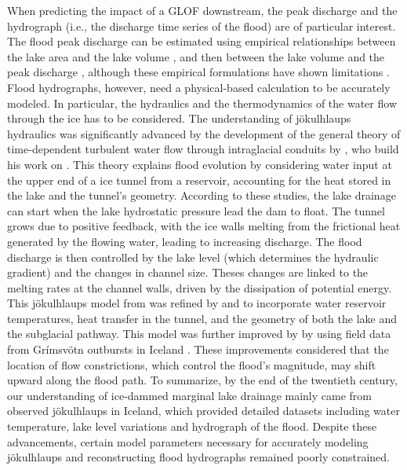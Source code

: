 When predicting the impact of a GLOF downstream, the peak discharge and the hydrograph (i.e., the discharge time series of the flood) are of particular interest. The flood peak discharge can be estimated using empirical relationships between the lake area and the lake volume \citep{Evans1986, Huggel&al2002, Cook&Quincey2015}, and then between the lake volume and the peak discharge \citep{Clague&Mathews1973, Haeberli1983, Costa1985, Evans1986, Walder&OConnor1997, Huggel&al2002}, although these empirical formulations have shown limitations \citep[e.g.][]{Huss&al2007}. Flood hydrographs, however, need a physical-based calculation to be accurately modeled. In particular, the hydraulics and the thermodynamics of the water flow through the ice has to be considered. The understanding of jökulhlaups hydraulics was significantly advanced by the development of the general theory of time-dependent turbulent water flow through intraglacial conduits by \cite{Nye1976}, who build his work on \cite{Roethlisberger1972,Shreve1972,Weertman1972}. This theory explains flood evolution by considering water input at the upper end of a ice tunnel from a reservoir, accounting for the heat stored in the lake and the tunnel's geometry. According to these studies, the lake drainage can start when the lake hydrostatic pressure lead the dam to float. The tunnel grows due to positive feedback, with the ice walls melting from the frictional heat generated by the flowing water, leading to increasing discharge. The flood discharge is then controlled by the lake level (which determines the hydraulic gradient) and the changes in channel size. Theses changes are linked to the melting rates at the channel walls, driven by the dissipation of potential energy. This jökulhlaups model from \cite{Nye1976} was refined by \cite{Spring&Hutter1981} and \cite{Clarke1982} to incorporate water reservoir temperatures, heat transfer in the tunnel, and the geometry of both the lake and the subglacial pathway. This model was further improved by \cite{Clarke2003} by using field data from Grímsvötn outbursts in Iceland \citep[see][]{Bjornsson2010}. These improvements considered that the location of flow constrictions, which control the flood's magnitude, may shift upward along the flood path. To summarize, by the end of the twentieth century, our understanding of ice-dammed marginal lake drainage mainly came from observed jökulhlaups in Iceland, which provided detailed datasets including water temperature, lake level variations and hydrograph of the flood. Despite these advancements, certain model parameters necessary for accurately modeling jökulhlaups and reconstructing flood hydrographs remained poorly constrained.

